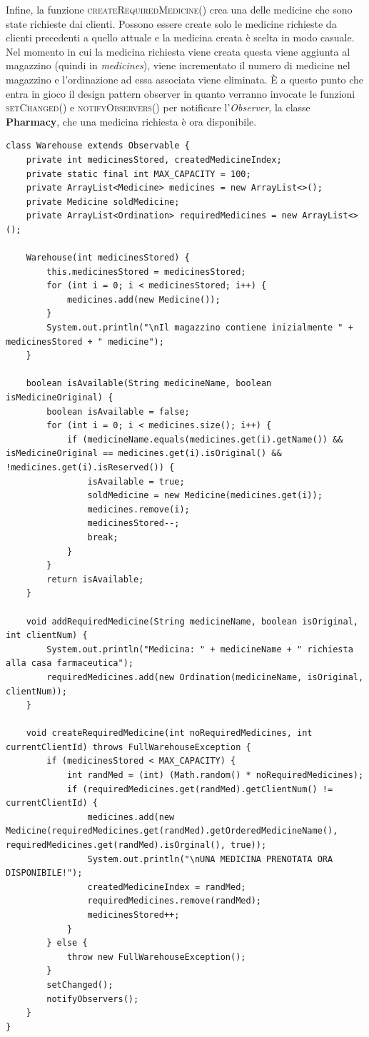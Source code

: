 \documentclass[a4paper, 10pt]{report}
\begin{document}
Infine, la funzione \textsc{createRequiredMedicine()} crea una delle medicine che sono state richieste dai clienti. Possono essere create solo le medicine richieste da clienti precedenti a quello attuale e la medicina creata è scelta in modo casuale. Nel momento in cui la medicina richiesta viene creata questa viene aggiunta al magazzino (quindi in \textit{medicines}), viene incrementato il numero di medicine nel magazzino e l'ordinazione ad essa associata viene eliminata. È a questo punto che entra in gioco il design pattern observer in quanto verranno invocate le funzioni \textsc{setChanged()} e \textsc{notifyObservers()} per notificare l'\textit{Observer}, la classe \textbf{Pharmacy}, che una medicina richiesta è ora disponibile.\\
\begin{lstlisting}
class Warehouse extends Observable {
    private int medicinesStored, createdMedicineIndex;
    private static final int MAX_CAPACITY = 100;
    private ArrayList<Medicine> medicines = new ArrayList<>();
    private Medicine soldMedicine;
    private ArrayList<Ordination> requiredMedicines = new ArrayList<>();

    Warehouse(int medicinesStored) {
        this.medicinesStored = medicinesStored;
        for (int i = 0; i < medicinesStored; i++) {
            medicines.add(new Medicine());
        }
        System.out.println("\nIl magazzino contiene inizialmente " + medicinesStored + " medicine");
    }

    boolean isAvailable(String medicineName, boolean isMedicineOriginal) {
        boolean isAvailable = false;
        for (int i = 0; i < medicines.size(); i++) {
            if (medicineName.equals(medicines.get(i).getName()) && isMedicineOriginal == medicines.get(i).isOriginal() && !medicines.get(i).isReserved()) {
                isAvailable = true;
                soldMedicine = new Medicine(medicines.get(i));
                medicines.remove(i);
                medicinesStored--;
                break;
            }
        }
        return isAvailable;
    }

    void addRequiredMedicine(String medicineName, boolean isOriginal, int clientNum) {
        System.out.println("Medicina: " + medicineName + " richiesta alla casa farmaceutica");
        requiredMedicines.add(new Ordination(medicineName, isOriginal, clientNum));
    }

    void createRequiredMedicine(int noRequiredMedicines, int currentClientId) throws FullWarehouseException {
        if (medicinesStored < MAX_CAPACITY) {
            int randMed = (int) (Math.random() * noRequiredMedicines);
            if (requiredMedicines.get(randMed).getClientNum() != currentClientId) {
                medicines.add(new Medicine(requiredMedicines.get(randMed).getOrderedMedicineName(), requiredMedicines.get(randMed).isOrginal(), true));
                System.out.println("\nUNA MEDICINA PRENOTATA ORA DISPONIBILE!");
                createdMedicineIndex = randMed;
                requiredMedicines.remove(randMed);
                medicinesStored++;
            }
        } else {
            throw new FullWarehouseException();
        }
        setChanged();
        notifyObservers();
    }
}
\end{lstlisting}
\end{document}

